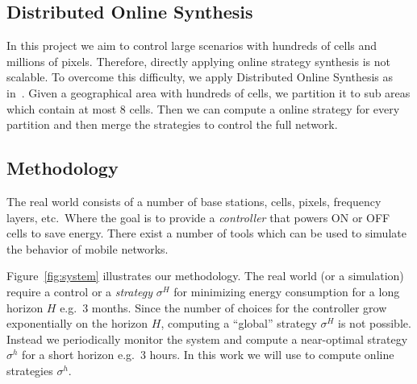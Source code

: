 \subsection{Distributed Online Synthesis}

In this project we aim to control large scenarios with hundreds of
cells and millions of pixels. Therefore, directly applying online
strategy synthesis is not scalable. To overcome this difficulty, we
apply Distributed Online Synthesis as
in~\cite{DBLP:conf/tacas/LarsenMMST16}. Given a geographical area with
hundreds of cells, we partition it to sub areas which contain at most 8
cells. Then we can compute a online strategy for every partition and
then merge the strategies to control the full network.


\subsection{Methodology}

The real world consists of a number of base stations, cells, pixels,
frequency layers, etc.\ Where the goal is to provide a
\emph{controller} that powers ON or OFF cells to save energy. There
exist a number of tools which can be used to simulate the behavior of
mobile networks.
%

Figure~\ref{fig:system} illustrates our methodology. The real world
(or a simulation) require a control or a \emph{strategy} $\sigma^H$
for minimizing energy consumption for a long horizon $H$ e.g.\ 3
months. Since the number of choices for the controller grow
exponentially on the horizon $H$, computing a ``global'' strategy
$\sigma^H$ is not possible. Instead we periodically monitor the system
and compute a near-optimal strategy $\sigma^h$ for a short horizon
e.g.\ 3 hours. In this work we will use \stratego{} to compute online
strategies $\sigma^h$.







